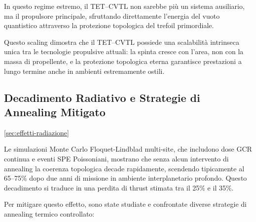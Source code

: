 \documentclass[11pt,a4paper]{article}
\let\oldref\ref
\renewcommand{\ref}{\protect\oldref}
\theoremstyle{plain}
\theoremstyle{definition}
\begin{document}
\vspace{0.3cm}

In questo regime estremo, il TET--CVTL non sarebbe più un sistema ausiliario, ma il propulsore principale, sfruttando direttamente l’energia del vuoto quantistico attraverso la protezione topologica del trefoil primordiale.


\vspace{0.3cm}

Questo scaling dimostra che il TET--CVTL possiede una scalabilità intrinseca unica tra le tecnologie propulsive attuali: la spinta cresce con l’area, non con la massa di propellente, e la protezione topologica eterna garantisce prestazioni a lungo termine anche in ambienti estremamente ostili.







\subsection{Decadimento Radiativo e Strategie di Annealing Mitigato}
\ref{sec:effetti-radiazione}

\vspace{0.1cm}



Le simulazioni Monte Carlo Floquet-Lindblad multi-site, che includono dose GCR continua e eventi SPE Poissoniani, mostrano che senza alcun intervento di annealing la coerenza topologica decade rapidamente, scendendo tipicamente al 65--75\% dopo due anni di missione in ambiente interplanetario profondo. Questo decadimento si traduce in una perdita di thrust stimata tra il 25\% e il 35\%.


\vspace{0.2cm}

Per mitigare questo effetto, sono state studiate e confrontate diverse strategie di annealing termico controllato:

\vspace{0.3cm}
\end{document}
